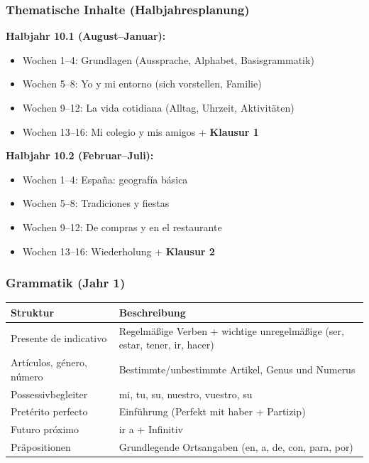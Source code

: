 \documentclass[10pt,a4paper]{article}
\begin{document}
\subsubsection{Thematische Inhalte (Halbjahresplanung)}

\textbf{Halbjahr 10.1 (August--Januar):}
\begin{itemize}[noitemsep]
\item Wochen 1--4: Grundlagen (Aussprache, Alphabet, Basisgrammatik)
\item Wochen 5--8: Yo y mi entorno (sich vorstellen, Familie)
\item Wochen 9--12: La vida cotidiana (Alltag, Uhrzeit, Aktivitäten)
\item Wochen 13--16: Mi colegio y mis amigos + \textbf{Klausur 1}
\end{itemize}

\textbf{Halbjahr 10.2 (Februar--Juli):}
\begin{itemize}[noitemsep]
\item Wochen 1--4: España: geografía básica
\item Wochen 5--8: Tradiciones y fiestas
\item Wochen 9--12: De compras y en el restaurante
\item Wochen 13--16: Wiederholung + \textbf{Klausur 2}
\end{itemize}

\subsubsection{Grammatik (Jahr 1)}

\begin{center}
\small
\begin{tabular}{|l|p{8cm}|}
\hline
\rowcolor{lightgray}
\textbf{Struktur} & \textbf{Beschreibung} \\
\hline
Presente de indicativo & Regelmäßige Verben + wichtige unregelmäßige (ser, estar, tener, ir, hacer) \\
\hline
Artículos, género, número & Bestimmte/unbestimmte Artikel, Genus und Numerus \\
\hline
Possessivbegleiter & mi, tu, su, nuestro, vuestro, su \\
\hline
Pretérito perfecto & Einführung (Perfekt mit haber + Partizip) \\
\hline
Futuro próximo & ir a + Infinitiv \\
\hline
Präpositionen & Grundlegende Ortsangaben (en, a, de, con, para, por) \\
\hline
\end{tabular}
\end{center}
\end{document}

